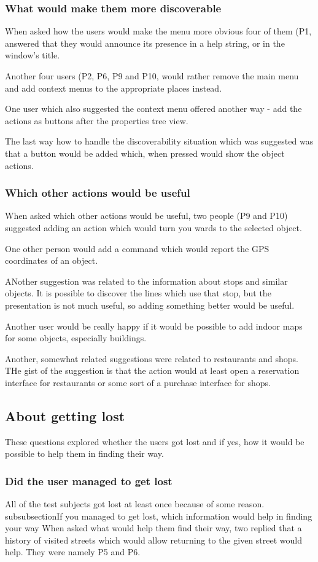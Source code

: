 \documentclass[nolof,digital]{fithesis3}
\begin{document}
\subsubsection{What would make them more discoverable}
When asked how the users would make the menu more obvious four of them (P1, answered that they would announce its presence in a help string, or in the window's title.

Another four users (P2, P6, P9 and P10, would rather remove the main menu and add context menus to the appropriate places instead.

One user which also suggested the context menu offered another way - add the actions as buttons after the properties tree view.

The last way how to handle the discoverability situation which was suggested was that a button would be added which, when pressed would show the object actions.
\subsubsection{Which other actions would be useful}
When asked which other actions would be useful, two people (P9 and P10) suggested adding an action which would turn you wards to the selected object.

One other person would add a command which would report the GPS coordinates of an object.

ANother suggestion was related to the information about stops and similar objects. It is possible to discover the lines which use that stop, but the presentation is not much useful, so adding something better would be useful.

Another user would be really happy if it would be possible to add indoor maps for some objects, especially buildings.

Another, somewhat related suggestions were related to restaurants and shops. THe gist of the suggestion is that the action would at least open a reservation interface for restaurants or some sort of a purchase interface for shops.
\subsection{About getting lost}
These questions explored whether the users got lost and if yes, how it would be possible to help them in finding their way.
\subsubsection{Did the user managed to get lost}
All of the test subjects got lost at least once because of some reason.
\\subsubsection{If you managed to get lost, which information would help in finding your way}
When asked what would help them find their way, two replied that a history of visited streets which would allow returning to the given street would help. They were namely P5 and P6.
\end{document}
